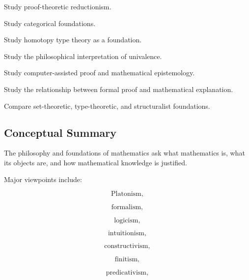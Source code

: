 \begin{exercise}[4]
Study proof-theoretic reductionism.
\end{exercise}

\begin{exercise}[4]
Study categorical foundations.
\end{exercise}

\begin{exercise}[4]
Study homotopy type theory as a foundation.
\end{exercise}

\begin{exercise}[4]
Study the philosophical interpretation of univalence.
\end{exercise}

\begin{exercise}[4]
Study computer-assisted proof and mathematical epistemology.
\end{exercise}

\begin{exercise}[4]
Study the relationship between formal proof and mathematical explanation.
\end{exercise}

\begin{exercise}[4]
Compare set-theoretic, type-theoretic, and structuralist foundations.
\end{exercise}

\subsection{Conceptual Summary}
\label{subsec:philosophy-foundations-summary}

The philosophy and foundations of mathematics ask what mathematics is,
what its objects are, and how mathematical knowledge is justified.

Major viewpoints include:

\[
\boxed{
\text{Platonism},
}
\]

\[
\boxed{
\text{formalism},
}
\]

\[
\boxed{
\text{logicism},
}
\]

\[
\boxed{
\text{intuitionism},
}
\]

\[
\boxed{
\text{constructivism},
}
\]

\[
\boxed{
\text{finitism},
}
\]

\[
\boxed{
\text{predicativism},
}
\]

